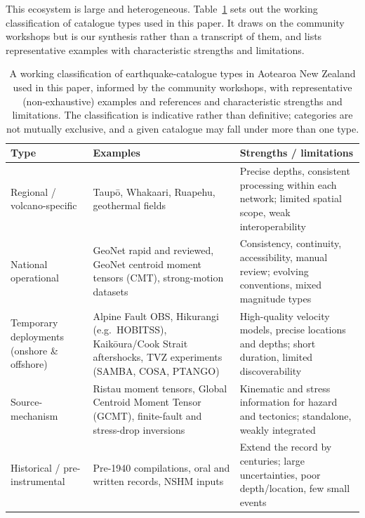 \documentclass[11pt]{article}
\begin{document}
This ecosystem is large and heterogeneous. Table~\ref{tab:nztypes} sets out the working classification of catalogue types used in this paper. It draws on the community workshops but is our synthesis rather than a transcript of them, and lists representative examples with characteristic strengths and limitations.

\begin{table}[H]
\centering
\small
\caption{A working classification of earthquake-catalogue types in Aotearoa New Zealand used in this paper, informed by the community workshops, with representative (non-exhaustive) examples and references and characteristic strengths and limitations. The classification is indicative rather than definitive; categories are not mutually exclusive, and a given catalogue may fall under more than one type.}
\label{tab:nztypes}
\setlength{\tabcolsep}{5pt}
\renewcommand{\arraystretch}{1.2}
\begin{tabular}{@{}>{\raggedright\arraybackslash}p{2.9cm}>{\raggedright\arraybackslash}p{6.1cm}>{\raggedright\arraybackslash}p{6.2cm}@{}}
\toprule
\textbf{Type} & \textbf{Examples} & \textbf{Strengths / limitations} \\
\midrule
Regional / volcano-specific & Taup\=o, Whakaari, Ruapehu, geothermal fields & Precise depths, consistent processing within each network; limited spatial scope, weak interoperability \\
\addlinespace
National operational & GeoNet rapid and reviewed, GeoNet centroid moment tensors (CMT), strong-motion datasets \citep{GeoNetEqCatalogue} & Consistency, continuity, accessibility, manual review; evolving conventions, mixed magnitude types \\
\addlinespace
Temporary deployments (onshore \& offshore) & Alpine Fault OBS, Hikurangi (e.g.\ HOBITSS), Kaik\=oura/Cook Strait aftershocks, TVZ experiments (SAMBA, COSA, PTANGO) \citep{Michailos2019, Yarce2019, AzizZanjani2021} & High-quality velocity models, precise locations and depths; short duration, limited discoverability \\
\addlinespace
Source-mechanism & Ristau moment tensors, Global Centroid Moment Tensor (GCMT), finite-fault and stress-drop inversions \citep{Ekstrom2012} & Kinematic and stress information for hazard and tectonics; standalone, weakly integrated \\
\addlinespace
Historical / pre-instrumental & Pre-1940 compilations, oral and written records, NSHM inputs \citep{Eiby1968a, Downes1995, NSHM2022BSSA} & Extend the record by centuries; large uncertainties, poor depth/location, few small events \\

\end{tabular}
\end{table}
\end{document}
